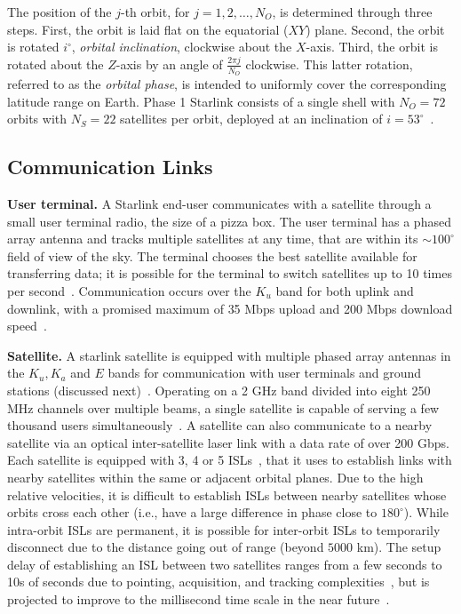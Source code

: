 \documentclass[acmsmall, screen]{acmart}
\begin{document}
The position of the $j$-th orbit, for $j=1,2,\ldots,N_O$, is determined through three steps. First, the orbit is laid flat on the equatorial ($XY$) plane. Second, the orbit is rotated $i^\circ$, \textit{orbital inclination}, clockwise about the $X$-axis. Third, the orbit is rotated about the $Z$-axis by an angle of $\frac{2\pi j}{N_O}$ clockwise. This latter rotation, referred to as the \textit{orbital phase}, is intended to uniformly cover the corresponding latitude range on Earth. Phase 1 Starlink consists of a single shell with $N_O = 72$ orbits with $N_S = 22$ satellites per orbit, deployed at an inclination of $i= 53^\circ$~\cite{starlinksatparameters}. 

\subsection{Communication Links}

\noindent 
{\bf User terminal.} A Starlink end-user communicates with a satellite through a small user terminal radio, the size of a pizza box. The user terminal has a phased array antenna and tracks multiple satellites at any time, that are within its $\sim 100^\circ$ field of view of the sky. The terminal chooses the best satellite available for transferring data; it is possible for the terminal to switch satellites up to 10 times per second~\cite{starlinkbeamswitching}. Communication occurs over the $K_u$ band for both uplink and downlink, with a promised maximum of 35 Mbps upload and 200 Mbps download speed~\cite{starlinkspecs}. 

\smallskip 
\noindent 
{\bf Satellite.} A starlink satellite is equipped with multiple phased array antennas in the $K_u, K_a$ and $E$ bands for communication with user terminals and ground stations (discussed next)~\cite{iyer2023system}. Operating on a 2 GHz band divided into eight 250 MHz channels over multiple beams, a single satellite is capable of serving a few thousand users simultaneously~\cite{iyer2023system}. A satellite can also communicate to a nearby satellite via an optical inter-satellite laser link with a data rate of over 200 Gbps. Each satellite is equipped with 3, 4 or 5 ISLs~\cite{starlinkstech, chaudhry2021laser}, that it uses to establish links with nearby satellites within the same or adjacent orbital planes. Due to the high relative velocities, it is difficult to establish ISLs between nearby satellites whose orbits cross each other (i.e., have a large difference in phase close to $180^\circ$). While intra-orbit ISLs are permanent, it is possible for inter-orbit ISLs to temporarily disconnect due to the distance going out of range (beyond $5000$ km). The setup delay of establishing an ISL between two satellites ranges from a few seconds to 10s of seconds due to pointing, acquisition, and tracking complexities~\cite{kaushal2017acquisition, carrizo2020optical}, but is projected to improve to the millisecond time scale in the near future~\cite{bhattacharjee2023laser}.  
\end{document}
